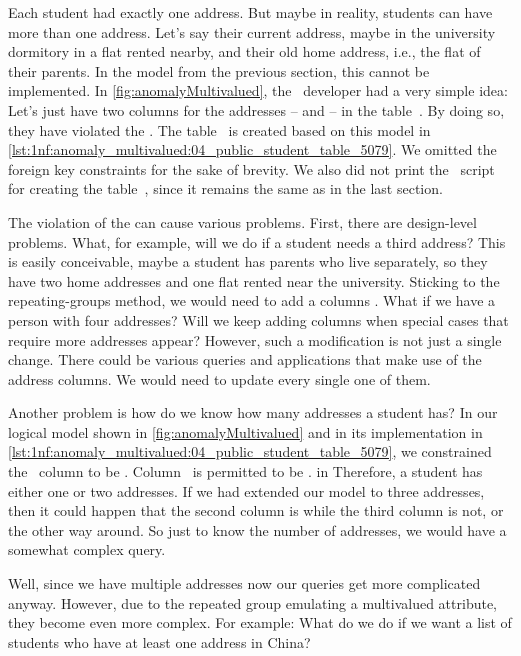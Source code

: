 Each student had exactly one address.
But maybe in reality, students can have more than one address.
Let's say their current address, maybe in the university dormitory in a flat rented nearby, and their old home address, i.e., the flat of their parents.
In the model from the previous section, this cannot be implemented.
In \cref{fig:anomalyMultivalued}, the \db\ developer had a very simple idea:
Let's just have two columns for the addresses --  and  -- in the table~.
By doing so, they have violated the .
The table~ is created based on this model in \cref{lst:1nf:anomaly_multivalued:04_public_student_table_5079}.
We omitted the foreign key  constraints for the sake of brevity.
We also did not print the \sql\ script for creating the table~, since it remains the same as in the last section.

The violation of the  can cause various problems.
First, there are design-level problems.
What, for example, will we do if a student needs a third address?
This is easily conceivable, maybe a student has parents who live separately, so they have two home addresses and one flat rented near the university.
Sticking to the repeating-groups method, we would need to add a columns .
What if we have a person with four addresses?
Will we keep adding columns when special cases that require more addresses appear?
However, such a modification is not just a single change.
There could be various queries and applications that make use of the address columns.
We would need to update every single one of them.

Another problem is how do we know how many addresses a student has?
In our logical model shown in \cref{fig:anomalyMultivalued} and in its implementation in \cref{lst:1nf:anomaly_multivalued:04_public_student_table_5079}, we constrained the ~column to be .
Column~ is permitted to be . in
Therefore, a student has either one or two addresses.
If we had extended our model to three addresses, then it could happen that the second column is  while the third column is not, or the other way around.
So just to know the number of addresses, we would have a somewhat complex query.

Well, since we have multiple addresses now our queries get more complicated anyway.
However, due to the repeated group emulating a multivalued attribute, they become even more complex.
For example:
What do we do if we want a list of students who have at least one address in China?

